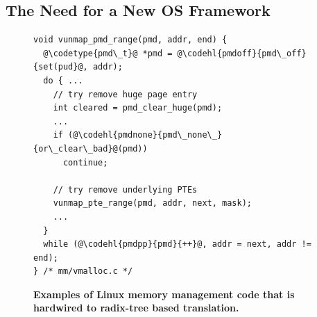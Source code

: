 \subsection{The Need for a New OS Framework}
\label{emt:sec:need}

\begin{figure}[H]
	\centering
\begin{singlespace}
\begin{verbatim}
void vunmap_pmd_range(pmd, addr, end) {
  @\codetype{pmd\_t}@ *pmd = @\codehl{pmdoff}{pmd\_off}{set(pud}@, addr);
  do { ...
    // try remove huge page entry
    int cleared = pmd_clear_huge(pmd);
    ...
    if (@\codehl{pmdnone}{pmd\_none\_}{or\_clear\_bad}@(pmd))
      continue;

    // try remove underlying PTEs
    vunmap_pte_range(pmd, addr, next, mask);
    ...
  }
  while (@\codehl{pmdpp}{pmd}{++}@, addr = next, addr != end);
} /* mm/vmalloc.c */
\end{verbatim}
\end{singlespace}


\caption{\bf Examples of Linux memory management code that is hardwired to
radix-tree based translation.} 
\label{emt:fig:need:linux-no-interface}
\end{figure}

